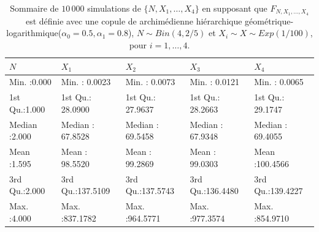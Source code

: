 \documentclass{article}
\begin{document}
	\begin{table}[H]
		\centering
		\begin{tabular}{lllll}
			\hline
			       $N$ &       $X_1$ &       $X_2$ &       $X_3$ &       $X_4$ \\ 
			\hline
			 Min.   :0.000   & Min.   :  0.0023   & Min.   :  0.0073   & Min.   :  0.0121   & Min.   :  0.0065   \\ 
			 1st Qu.:1.000   & 1st Qu.: 28.0900   & 1st Qu.: 27.9637   & 1st Qu.: 28.2663   & 1st Qu.: 29.1747   \\ 
			 Median :2.000   & Median : 67.8528   & Median : 69.5458   & Median : 67.9348   & Median : 69.4055   \\ 
			 Mean   :1.595   & Mean   : 98.5520   & Mean   : 99.2869   & Mean   : 99.0303   & Mean   :100.4566   \\ 
			 3rd Qu.:2.000   & 3rd Qu.:137.5109   & 3rd Qu.:137.5743   & 3rd Qu.:136.4480   & 3rd Qu.:139.4227   \\ 
			 Max.   :4.000   & Max.   :837.1782   & Max.   :964.5771   & Max.   :977.3574   & Max.   :854.9710   \\ 
			\hline
		\end{tabular}
		\caption[Sommaire des données simulées pour le scénario \ref{scenario_geo_log}]{Sommaire de $10\,000$ simulations de $\{N, X_1, \dots, X_4\}$ en supposant que $F_{N,X_1,\dots, X_4}$ est définie avec une copule de archimédienne hiérarchique géométrique-logarithmique($\alpha_0=0.5, \alpha_1 = 0.8$), $N \sim Bin(4, 2/5)$ et $X_i \sim X \sim Exp(1/100)$, pour $i=1,\dots, 4$.}
		\label{tbl_sommaire_geo_log}
	\end{table}
	
\end{document}
